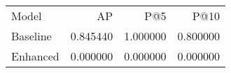 \begin{tabular}{lrrr}
Model & AP & P@5 & P@10 \\
Baseline & 0.845440 & 1.000000 & 0.800000 \\
Enhanced & 0.000000 & 0.000000 & 0.000000 \\
\end{tabular}
